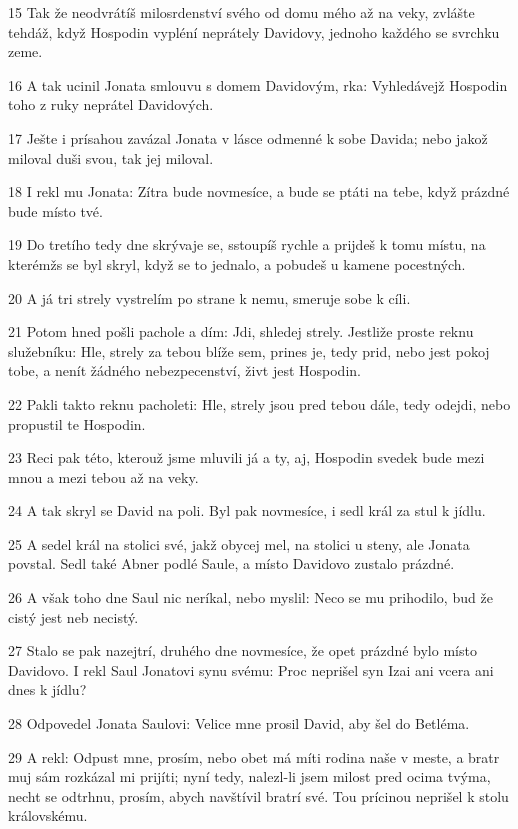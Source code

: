 \par 15 Tak že neodvrátíš milosrdenství svého od domu mého až na veky, zvlášte tehdáž, když Hospodin vypléní neprátely Davidovy, jednoho každého se svrchku zeme.
\par 16 A tak ucinil Jonata smlouvu s domem Davidovým, rka: Vyhledávejž Hospodin toho z ruky neprátel Davidových.
\par 17 Ješte i prísahou zavázal Jonata v lásce odmenné k sobe Davida; nebo jakož miloval duši svou, tak jej miloval.
\par 18 I rekl mu Jonata: Zítra bude novmesíce, a bude se ptáti na tebe, když prázdné bude místo tvé.
\par 19 Do tretího tedy dne skrývaje se, sstoupíš rychle a prijdeš k tomu místu, na kterémžs se byl skryl, když se to jednalo, a pobudeš u kamene pocestných.
\par 20 A já tri strely vystrelím po strane k nemu, smeruje sobe k cíli.
\par 21 Potom hned pošli pachole a dím: Jdi, shledej strely. Jestliže proste reknu služebníku: Hle, strely za tebou blíže sem, prines je, tedy prid, nebo jest pokoj tobe, a nenít žádného nebezpecenství, živt jest Hospodin.
\par 22 Pakli takto reknu pacholeti: Hle, strely jsou pred tebou dále, tedy odejdi, nebo propustil te Hospodin.
\par 23 Reci pak této, kterouž jsme mluvili já a ty, aj, Hospodin svedek bude mezi mnou a mezi tebou až na veky.
\par 24 A tak skryl se David na poli. Byl pak novmesíce, i sedl král za stul k jídlu.
\par 25 A sedel král na stolici své, jakž obycej mel, na stolici u steny, ale Jonata povstal. Sedl také Abner podlé Saule, a místo Davidovo zustalo prázdné.
\par 26 A však toho dne Saul nic neríkal, nebo myslil: Neco se mu prihodilo, bud že cistý jest neb necistý.
\par 27 Stalo se pak nazejtrí, druhého dne novmesíce, že opet prázdné bylo místo Davidovo. I rekl Saul Jonatovi synu svému: Proc neprišel syn Izai ani vcera ani dnes k jídlu?
\par 28 Odpovedel Jonata Saulovi: Velice mne prosil David, aby šel do Betléma.
\par 29 A rekl: Odpust mne, prosím, nebo obet má míti rodina naše v meste, a bratr muj sám rozkázal mi prijíti; nyní tedy, nalezl-li jsem milost pred ocima tvýma, necht se odtrhnu, prosím, abych navštívil bratrí své. Tou prícinou neprišel k stolu královskému.
